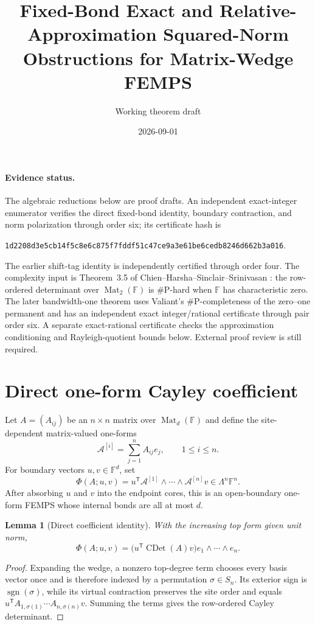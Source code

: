 \documentclass[11pt]{article}
\title{Fixed-Bond Exact and Relative-Approximation Squared-Norm Obstructions for Matrix-Wedge FEMPS}
\author{Working theorem draft}
\date{2026-09-01}
\newtheorem{lemma}[theorem]{Lemma}
\newcommand{\Mat}{\operatorname{Mat}}
\newcommand{\CayleyDet}{\operatorname{CDet}}
\begin{document}
\maketitle

\paragraph{Evidence status.}
The algebraic reductions below are proof drafts. An independent exact-integer
enumerator verifies the direct fixed-bond identity, boundary contraction, and
norm polarization through order six; its certificate hash is
\begin{center}
\small\texttt{1d2208d3e5cb14f5c8e6c875f7fddf51c47ce9a3e61be6cedb8246d662b3a016}.
\end{center}
The earlier shift-tag identity is independently certified through order four.
The complexity input is Theorem~3.5 of
Chien--Harsha--Sinclair--Srinivasan
\cite{ChienEtAl2011}: the row-ordered
determinant over $\Mat_2(\mathbb F)$ is \#P-hard when $\mathbb F$ has
characteristic zero. The later bandwidth-one theorem uses Valiant's
\#P-completeness of the zero--one permanent and has an independent exact
integer/rational certificate through pair order six. A separate exact-rational
certificate checks the approximation conditioning and Rayleigh-quotient bounds
below. External proof review is still required.

\section{Direct one-form Cayley coefficient}

Let $A=(A_{ij})$ be an $n\times n$ matrix over $\Mat_d(\mathbb F)$ and define
the site-dependent matrix-valued one-forms
\[
  \mathcal A^{[i]}=\sum_{j=1}^n A_{ij}e_j,
  \qquad 1\le i\le n.
\]
For boundary vectors $u,v\in\mathbb F^d$, set
\[
  \Phi(A;u,v)=u^{\mathsf T}
  \mathcal A^{[1]}\wedge\cdots\wedge\mathcal A^{[n]}v
  \in\Lambda^n\mathbb F^n.
\]
After absorbing $u$ and $v$ into the endpoint cores, this is an open-boundary
one-form FEMPS whose internal bonds are all at most $d$.

\begin{lemma}[Direct coefficient identity]
With the increasing top form given unit norm,
\[
  \Phi(A;u,v)=
  \bigl(u^{\mathsf T}\CayleyDet(A)v\bigr)
  e_1\wedge\cdots\wedge e_n.
\]
\end{lemma}

\begin{proof}
Expanding the wedge, a nonzero top-degree term chooses every basis vector once
and is therefore indexed by a permutation $\sigma\in S_n$.  Its exterior sign
is $\operatorname{sgn}(\sigma)$, while its virtual contraction preserves the
site order and equals
$u^{\mathsf T}A_{1,\sigma(1)}\cdots A_{n,\sigma(n)}v$.
Summing the terms gives the row-ordered Cayley determinant.
\end{proof}
\end{document}
